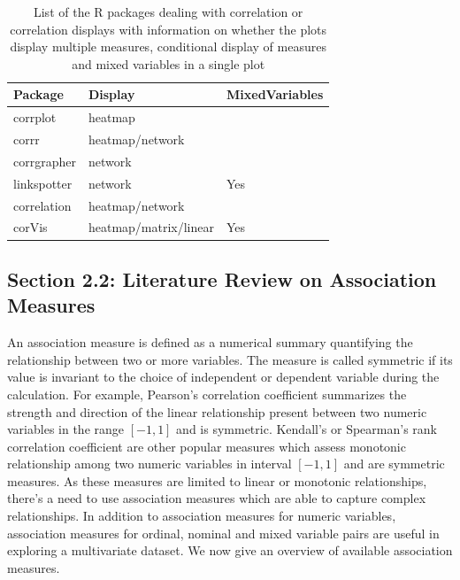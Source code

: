 \begin{Schunk}
\begin{table}

\caption{\label{tab:corrdisplay-packages}List of the R packages dealing with correlation or correlation displays with information on whether the plots display multiple measures, conditional display of measures and mixed variables in a single plot}
\centering
\begin{tabular}[t]{lll}
\toprule
Package & Display & MixedVariables\\
\midrule
corrplot & heatmap & \\
corrr & heatmap/network & \\
corrgrapher & network & \\
linkspotter & network & Yes\\
correlation & heatmap/network & \\
\addlinespace
corVis & heatmap/matrix/linear & Yes\\
\bottomrule
\end{tabular}
\end{table}

\end{Schunk}

\hypertarget{section-2.2-literature-review-on-association-measures}{%
\subsection{Section 2.2: Literature Review on Association
Measures}\label{section-2.2-literature-review-on-association-measures}}

An association measure is defined as a numerical summary quantifying the
relationship between two or more variables. The measure is called
symmetric if its value is invariant to the choice of independent or
dependent variable during the calculation. For example, Pearson's
correlation coefficient summarizes the strength and direction of the
linear relationship present between two numeric variables in the range
\([-1,1]\) and is symmetric. Kendall's or Spearman's rank correlation
coefficient are other popular measures which assess monotonic
relationship among two numeric variables in interval \([-1,1]\) and are
symmetric measures. As these measures are limited to linear or monotonic
relationships, there's a need to use association measures which are able
to capture complex relationships. In addition to association measures
for numeric variables, association measures for ordinal, nominal and
mixed variable pairs are useful in exploring a multivariate dataset. We
now give an overview of available association measures.

